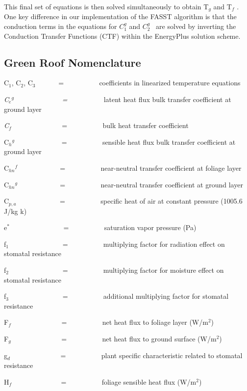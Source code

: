 This final set of equations is then solved simultaneously to obtain T\emph{\(_{g}\)} and T\emph{\(_{f}\)} . One key difference in our implementation of the FASST algorithm is that the conduction terms in the equations for \(C_1^g\) and \(C_2^g\) ~are solved by inverting the Conduction Transfer Functions (CTF) within the EnergyPlus solution scheme.

\subsection{Green Roof Nomenclature}\label{green-roof-nomenclature}

C\(_{1}\), C\(_{2}\), C\(_{3}\)~~~~~~ = ~~~~~~~~~ coefficients in linearized temperature equations

\emph{C\(_{e}\)\(^{g}\)~~~~~~~~~~~~~ = ~~~~~~~~~} latent heat flux bulk transfer coefficient at ground layer

\emph{C\(_{f}\)~~ ~~~~~~~~~~~} = ~~~~~~~~~ bulk heat transfer coefficient

C\(_{h}\)\(^{g}\)~~~~~~~~~~~~~ = ~~~~~~~~~ sensible heat flux bulk transfer coefficient at ground layer

C\(_{hn}\)\(^{f}\) ~~~~~~~~~~~ = ~~~~~~~~~ near-neutral transfer coefficient at foliage layer

C\(_{hn}\)\(^{g}\) ~~~~~~~~~~~ = ~~~~~~~~~ near-neutral transfer coefficient at ground layer

C\(_{p,a}\)~~~~~~~~~~~~ = ~~~~~~~~~ specific heat of air at constant pressure (1005.6 J/kg k)

e\(^{*}\)~~~~~~~~~~~~~~~ = ~~~~~~~~~ saturation vapor pressure (Pa)

f\(_{1}\)~~~~~~~~~~~~~~~ = ~~~~~~~~~ multiplying factor for radiation effect on stomatal resistance

f\(_{2}\)~~~~~~~~~~~~~~~ = ~~~~~~~~~ multiplying factor for moisture effect on stomatal resistance

f\(_{3}\)~~~~~~~~~~~~~~~ = ~~~~~~~~~ additional multiplying factor for stomatal resistance

F\(_{f}\)~~~~~~~~~~~~~~ = ~~~~~~~~~ net heat flux to foliage layer (W/m\(^{2}\))

F\(_{g}\)~~~~~~~~~~~~~~ = ~~~~~~~~~ net heat flux to ground surface (W/m\(^{2}\))

g\(_{d}\)~~~~~~~~~~~~~~ = ~~~~~~~~~ plant specific characteristic related to stomatal resistance

H\(_{f}\) ~~~~~~~~~~~~~ = ~~~~~~~~~ foliage sensible heat flux (W/m\(^{2}\))


